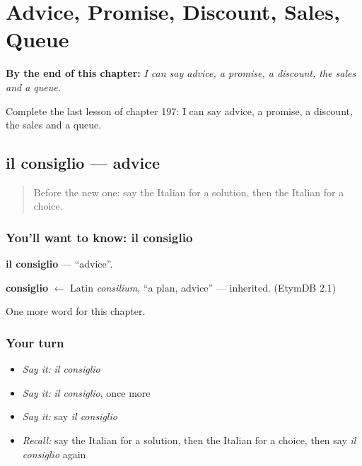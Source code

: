 
\chapter{Advice, Promise, Discount, Sales, Queue}
\label{ch:it-advice-promise-discount-sales-queue}

\begin{chapteropening}
\textbf{By the end of this chapter:} \emph{I can say advice, a promise, a discount, the sales and a queue.}

Complete the last lesson of chapter 197: I can say advice, a promise, a discount, the sales and a queue.
\end{chapteropening}

\section[il consiglio]{il consiglio — advice}

\label{lesson:IT-C197-consiglio}



\begin{quote}
Before the new one: say the Italian for a solution, then the Italian for a choice.
\end{quote}

\subsection*{You'll want to know: il consiglio}
\textbf{il consiglio} — \textquotedblleft{}advice\textquotedblright{}.

\begin{cousinweb}
\textbf{consiglio} $\leftarrow$ Latin \emph{consilium}, \textquotedblleft{}a plan, advice\textquotedblright{} — inherited. (EtymDB 2.1)
\end{cousinweb}

\begin{grammarlens}[title={What you've built}]
One more word for this chapter.
\end{grammarlens}

\subsection*{Your turn}
\begin{itemize}
\raggedright
  \item \emph{Say it:} \emph{il consiglio}
  \item \emph{Say it:} \emph{il consiglio}, once more
  \item \emph{Say it:} say \emph{il consiglio}
  \item \emph{Recall:} say the Italian for a solution, then the Italian for a choice, then say \emph{il consiglio} again
\end{itemize}

